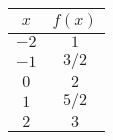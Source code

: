 \begin{tabular}{cc} \toprule
$x$  & $f(x)$  \\\midrule
$-2$ & $1$     \\
$-1$ & $3 / 2$ \\
$0$  & $2$     \\
$1$  & $5 / 2$ \\
$2$  & $3$     \\\bottomrule
\end{tabular}
